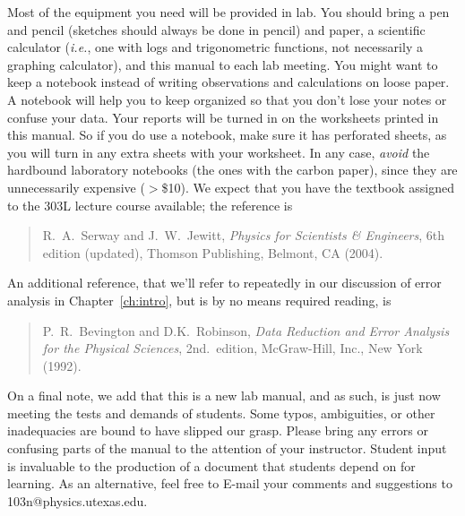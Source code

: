 Most of the equipment you need will be provided in lab.  You should bring a 
pen and pencil (sketches should always be done in pencil) and paper, a scientific calculator ({\it i.e.}, one with logs and trigonometric 
functions, not necessarily a graphing calculator), and this 
manual to each lab 
meeting.  You might want to keep a notebook instead of writing observations
and calculations on loose paper.  A notebook will help you to keep organized 
so that you don't lose your notes or confuse your data.  Your reports will be 
turned in on the worksheets printed in this manual.  So if you do use a 
notebook, make sure it has perforated sheets, as you will turn in any extra 
sheets with your worksheet.  In any case, 
{\it avoid} the hardbound laboratory notebooks 
(the ones with the carbon paper), since they are unnecessarily expensive 
($>$\$10).  We expect that you have the textbook assigned to the 303L lecture 
course available; the reference is
\begin{quote}
R.\ A.\ Serway and J.\ W.\ Jewitt, {\it Physics for Scientists \& Engineers}, 6th edition 
(updated), Thomson Publishing, Belmont, CA (2004). 
\end{quote}
An additional reference, that we'll refer to repeatedly in our discussion of
error analysis in Chapter~\ref{ch:intro}, but is by no means required reading,
is
\begin{quote}
P.\ R.\ Bevington and D.K.\ Robinson, {\it Data Reduction and Error Analysis 
for the Physical Sciences}, 2nd.\ edition, McGraw-Hill, Inc., New York (1992).
\end{quote}

On a final note, we add that this is a new lab manual, and as such, is just now
meeting the tests and demands of students. Some typos, ambiguities, or other
inadequacies are bound to have slipped our grasp.  Please bring any errors or
confusing parts of the manual to the attention of your instructor.  Student
input is invaluable to the production of a document that students depend on for
learning.  As an alternative, feel free to E-mail your comments and suggestions
to 103n@physics.utexas.edu. \\ 
\thispagestyle{empty}
%
\vfill

